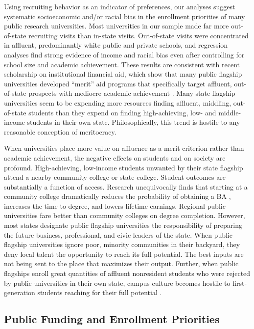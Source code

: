 \documentclass{article}
\begin{document}
Using recruiting behavior as an indicator of preferences, our analyses suggest systematic socioeconomic and/or racial bias in the enrollment priorities of many public research universities. Most universities in our sample made far more out-of-state recruiting visits than in-state visits.  Out-of-state visits were concentrated in affluent, predominantly white public and private schools, and regression analyses find strong evidence of income and racial bias even after controlling for school size and academic achievement. These results are consistent with recent scholarship on institutional financial aid, which show that many public flagship universities developed ``merit'' aid programs that specifically target affluent, out-of-state prospects with mediocre academic achievement \citep{RN4409, RN4032, RN3519, RN3762, RN4494}. Many state flagship universities seem to be expending more resources finding affluent, middling, out-of-state students than they expend on finding high-achieving, low- and middle-income students in their own state. Philosophically, this trend is hostile to any reasonable conception of meritocracy.

When universities place more value on affluence as a merit criterion rather than academic achievement, the negative effects on students and on society are profound. High-achieving, low-income students unwanted by their state flagship attend a nearby community college or state college. Student outcomes are substantially a function of access. Research unequivocally finds that starting at a community college dramatically reduces the probability of obtaining a BA \citep{RN4469_alt, RN2261}, increases the time to degree, and lowers lifetime earnings. Regional public universities fare better than community colleges on degree completion. However, most states designate public flagship universities the responsibility of preparing the future business, professional, and civic leaders of the state. When public flagship universities ignore poor, minority communities in their backyard, they deny local talent the opportunity to reach its full potential. The best inputs are not being sent to the place that maximizes their output. Further, when public flagships enroll great quantities of affluent nonresident students who were rejected by public universities in their own state, campus culture becomes hostile to first-generation students reaching for their full potential \citep{RN4231}.

\subsection*{Public Funding and Enrollment Priorities}
\end{document}
